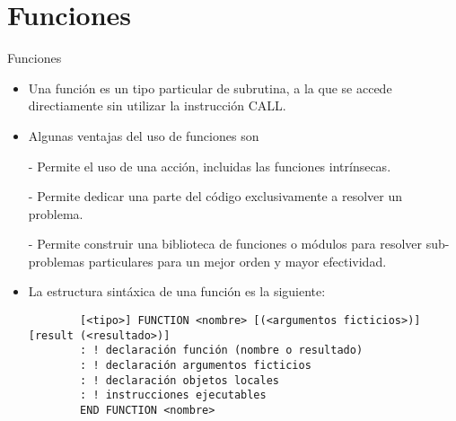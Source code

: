 
\section{Funciones}  



\begin{frame}[fragile]{Funciones}
 \begin{itemize}[<+(0)->]
  \item Una función es un tipo particular de subrutina, a la que se accede directiamente sin utilizar la instrucción CALL.
  \item Algunas ventajas del uso de funciones son
  \item [-]Permite el uso de una acción, incluidas las funciones intrínsecas.
  \item [-]Permite dedicar una parte del código exclusivamente a resolver un problema.
  \item [-]Permite construir una biblioteca de funciones o módulos para resolver sub-problemas particulares para un mejor orden y mayor efectividad. 
  \item La estructura sintáxica de una función es la siguiente:
        \begin{verbatim}
        [<tipo>] FUNCTION <nombre> [(<argumentos ficticios>)] [result (<resultado>)]
        : ! declaración función (nombre o resultado)
        : ! declaración argumentos ficticios
        : ! declaración objetos locales
        : ! instrucciones ejecutables
        END FUNCTION <nombre>
        \end{verbatim}
 \end{itemize}
\end{frame}

